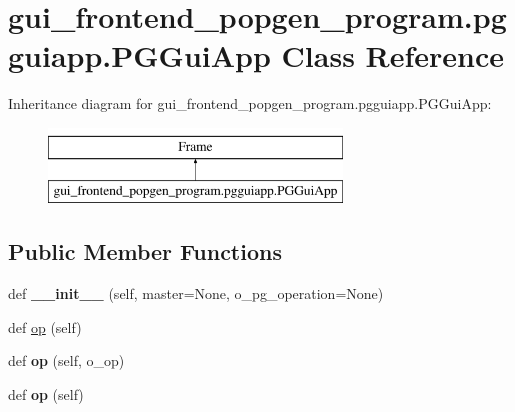\hypertarget{classgui__frontend__popgen__program_1_1pgguiapp_1_1PGGuiApp}{}\section{gui\+\_\+frontend\+\_\+popgen\+\_\+program.\+pgguiapp.\+P\+G\+Gui\+App Class Reference}
\label{classgui__frontend__popgen__program_1_1pgguiapp_1_1PGGuiApp}
Inheritance diagram for gui\+\_\+frontend\+\_\+popgen\+\_\+program.\+pgguiapp.\+P\+G\+Gui\+App\+:\begin{figure}[H]
\begin{center}
\leavevmode
\includegraphics[height=2.000000cm]{classgui__frontend__popgen__program_1_1pgguiapp_1_1PGGuiApp}
\end{center}
\end{figure}
\subsection*{Public Member Functions}
\begin{DoxyCompactItemize}
\item 
def {\bfseries \+\_\+\+\_\+init\+\_\+\+\_\+} (self, master=None, o\+\_\+pg\+\_\+operation=None)\hypertarget{classgui__frontend__popgen__program_1_1pgguiapp_1_1PGGuiApp_add38f2accca7063b372c21581b98eb02}{}\label{classgui__frontend__popgen__program_1_1pgguiapp_1_1PGGuiApp_add38f2accca7063b372c21581b98eb02}

\item 
def \hyperlink{classgui__frontend__popgen__program_1_1pgguiapp_1_1PGGuiApp_af8c1f5a2a4cc57df73ea55266b000381}{op} (self)
\item 
def {\bfseries op} (self, o\+\_\+op)\hypertarget{classgui__frontend__popgen__program_1_1pgguiapp_1_1PGGuiApp_a8e20d8a2c9cc8b65c03250d5d64d6c75}{}\label{classgui__frontend__popgen__program_1_1pgguiapp_1_1PGGuiApp_a8e20d8a2c9cc8b65c03250d5d64d6c75}

\item 
def {\bfseries op} (self)\hypertarget{classgui__frontend__popgen__program_1_1pgguiapp_1_1PGGuiApp_af8c1f5a2a4cc57df73ea55266b000381}{}\label{classgui__frontend__popgen__program_1_1pgguiapp_1_1PGGuiApp_af8c1f5a2a4cc57df73ea55266b000381}

\end{DoxyCompactItemize}


